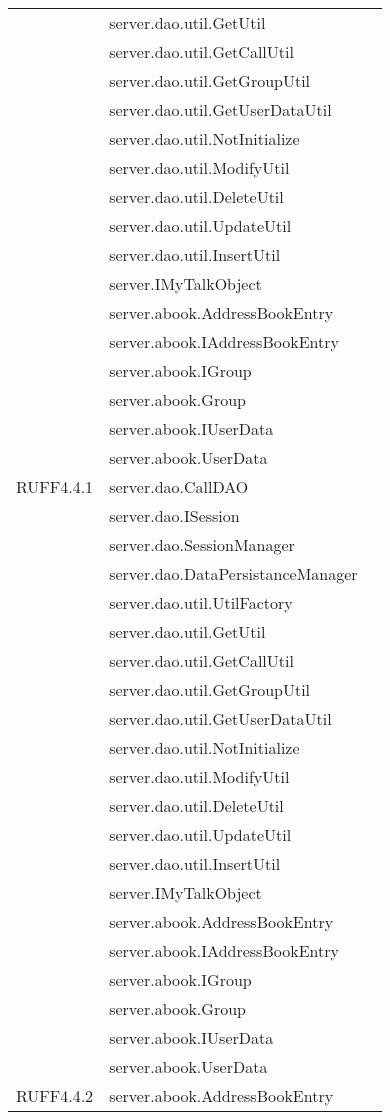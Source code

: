 \begin{center}
\begin{longtable}{lp{}l}
& server.dao.util.GetUtil\\
& server.dao.util.GetCallUtil\\
& server.dao.util.GetGroupUtil\\
& server.dao.util.GetUserDataUtil\\
& server.dao.util.NotInitialize\\
& server.dao.util.ModifyUtil\\
& server.dao.util.DeleteUtil\\
& server.dao.util.UpdateUtil\\
& server.dao.util.InsertUtil\\
& server.IMyTalkObject\\
& server.abook.AddressBookEntry\\
& server.abook.IAddressBookEntry\\
& server.abook.IGroup\\
& server.abook.Group\\
& server.abook.IUserData\\
& server.abook.UserData\\
RUFF4.4.1 & server.dao.CallDAO\\
& server.dao.ISession\\
& server.dao.SessionManager\\
& server.dao.DataPersistanceManager\\
& server.dao.util.UtilFactory\\
& server.dao.util.GetUtil\\
& server.dao.util.GetCallUtil\\
& server.dao.util.GetGroupUtil\\
& server.dao.util.GetUserDataUtil\\
& server.dao.util.NotInitialize\\
& server.dao.util.ModifyUtil\\
& server.dao.util.DeleteUtil\\
& server.dao.util.UpdateUtil\\
& server.dao.util.InsertUtil\\
& server.IMyTalkObject\\
& server.abook.AddressBookEntry\\
& server.abook.IAddressBookEntry\\
& server.abook.IGroup\\
& server.abook.Group\\
& server.abook.IUserData\\
& server.abook.UserData\\
RUFF4.4.2 & server.abook.AddressBookEntry\\

\end{longtable}
\end{center}
